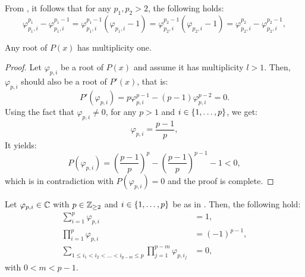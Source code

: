 \documentclass{article}
\begin{document}
    \begin{remark}
      From , it follows that for any $p_1, p_2 > 2$, the following holds:
      \begin{equation}
        \varphi_{p_1, i}^{p_1} - \varphi_{p_1, i}^{p_1-1} = \varphi_{p_1, i}^{p_1-1}(\varphi_{p_1, i} - 1) 
        = \varphi_{p_2, i}^{p_2-1}(\varphi_{p_2, i} - 1)  = \varphi_{p_2, i}^{p_2} - \varphi_{p_2, i}^{p_2-1},
      \end{equation}
    \end{remark}

    \begin{theorem} \label{thm:multiplicity}
      Any root of $P(x)$ has multiplicity one.
    \end{theorem}
    \begin{proof}
      Let $\varphi_{p, i}$ be a root of $P(x)$ and assume it has multiplicity $l > 1$. Then, $\varphi_{p, i}$ should also be a root of $P'(x)$, that is:
      \begin{equation}
        P'(\varphi_{p, i}) = p \varphi_{p, i}^{p-1} - (p - 1)\varphi_{p, i}^{p-2} = 0.
      \end{equation}
      Using the fact that $\varphi_{p, i} \neq 0$, for any $p > 1$ and $i \in \{1, \dots, p\}$, we get:
      \begin{equation}
        \varphi_{p, i} = \frac{p-1}{p},
      \end{equation}
      It yields:
      \begin{equation}
        P(\varphi_{p, i}) = \left(\frac{p-1}{p}\right)^p - \left(\frac{p-1}{p}\right)^{p-1} - 1 < 0,
      \end{equation}
      which is in contradiction with $P(\varphi_{p, i}) = 0$ and the proof is complete.
    \end{proof}

    \begin{theorem} \label{thm:sum_prod_roots}
      Let $\varphi_{p, i} \in \mathbb C$ with $p \in \mathbb{Z}_{\geq 2}$ and $i \in \{1, \dots, p\}$ be as in . Then, the following hold:
      \begin{align}
        \sum_{i=1}^p \varphi_{p, i} & = 1, \\
        \prod_{i=1}^p \varphi_{p, i} & = (-1)^{p-1}, \\
        \sum_{1 \leq i_1 < i_2 < \dots < i_{p - m} \leq p} \prod_{j=1}^{p - m} \varphi_{p, i_j} & = 0,
      \end{align}
      with $0 < m < p - 1$. 
    \end{theorem}
\end{document}
